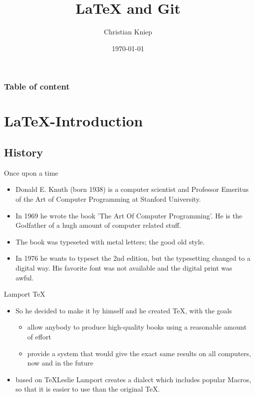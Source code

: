 \documentclass[hyperref={pdfpagelabels=false}]{beamer}
\author{Christian Kniep}
\begin{document}
\title{LaTeX and Git}  
\date[\today]{\today} 

\begin{frame}
	\titlepage
\end{frame} 

\begin{frame}
	\frametitle{Table of content}
	\tableofcontents
\end{frame} 


\section{LaTeX-Introduction} 
	\subsection{History}
		\begin{frame}{Once upon a time}
			\begin{itemize}
				\item<1-> Donald  E. Knuth (born 1938) is a computer scientist and Professor Emeritus of the Art of Computer Programming at Stanford University.
                \item<2-> In 1969 he wrote the book 'The Art Of Computer Programming'. He is the Godfather of a hugh amount of computer related stuff.
                \item<3-> The book was typeseted with metal letters; the good old style.
                \item<4-> In 1976 he wants to typeset the 2nd edition, but the typesetting changed to a digital way. His favorite font was not available and the digital print was awful.
            \end{itemize}
		\end{frame}
        \begin{frame}{Lamport TeX}
			\begin{itemize}
                \item<1-> So he decided to make it by himself and he created \TeX, with the goals
                \begin{itemize}
                    \item<2-> allow anybody to produce high-quality books using a reasonable amount of effort
                    \item<3-> provide a system that would give the exact same results on all computers, now and in the future
                \end{itemize}
				\item<4-> based on \TeX Leslie Lamport creates a dialect which includes popular Macros, so that it is easier to use than the original TeX.
            \end{itemize}
		\end{frame}
\end{document}

